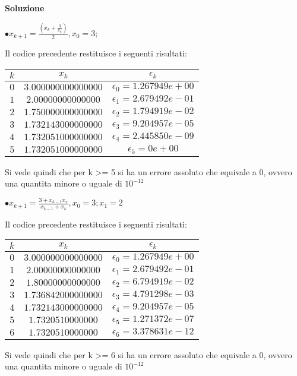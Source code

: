 \begin{flushleft}
	\large \textbf{Soluzione}\\[0.3cm]
	\begin{Large}
	$\bullet x_{k+1} = \frac{(x_{k} + \frac{3}{x_{k}})}{2}, x_{0} = 3;$\\[0.3cm]
	\end{Large}
	
	Il codice precedente restituisce i seguenti risultati: 
	\begin{center}
		\begin{tabular}{|c|c|c|}
			\hline
				$k$ & $x_{k}$&$\epsilon_{k} $\\
			\hline
    			$0$ & $3.000000000000000$ & $ \epsilon_{0} = 1.267949e+00$\\
    			$1$ & $2.00000000000000$ & $ \epsilon_{1} = 2.679492e-01$\\
    			$2$ & $1.750000000000000$ & $\epsilon_{2} = 1.794919e-02$\\
    			$3$ & $1.732143000000000$ & $\epsilon_{3} = 9.204957e-05$\\
    			$4$ & $1.732051000000000$ & $\epsilon_{4} = 2.445850e-09$\\
    			$5$ & $1.732051000000000$ & $\epsilon_{5} = 0e+00$\\
			\hline
		\end{tabular}
	\end{center}
	Si vede quindi che per k >= 5 si ha un errore assoluto che equivale a 0, ovvero una quantita  minore o uguale di $10^{-12}$\\[0.3cm]
	\begin{Large}
	$\bullet x_{k+1} = \frac{3+x_{k-1}x_{x}}{x_{k-1}+x_{k}}, x_{0} = 3; x_{1} = 2$\\[0.3cm]
	\end{Large}
	
	Il codice precedente restituisce i seguenti risultati: 
	\begin{center}
		\begin{tabular}{|c|c|c|}
			\hline
				$k$ & $x_{k}$&$\epsilon_{k} $\\
			\hline
    			$0$ & $3.000000000000000$ & $ \epsilon_{0} = 1.267949e+00$\\
    			$1$ & $2.00000000000000$ & $ \epsilon_{1} = 2.679492e-01$\\
    			$2$ & $1.80000000000000$ & $\epsilon_{2} = 6.794919e-02$\\
			$3$ & $1.736842000000000$ & $\epsilon_{3} = 4.791298e-03$\\
    			$4$ & $1.732143000000000$ & $\epsilon_{4} = 9.204957e-05$\\
    			$5$ & $1.7320510000000$ & $\epsilon_{5} = 1.271372e-07$\\
			$6$ & $1.7320510000000$ & $\epsilon_{6} = 3.378631e-12$\\
			\hline
		\end{tabular}
	\end{center}
	Si vede quindi che per k >= 6 si ha un errore assoluto che equivale a 0, ovvero una quantita  minore o uguale di $10^{-12}$\\[0.3cm]
	\end{flushleft}
